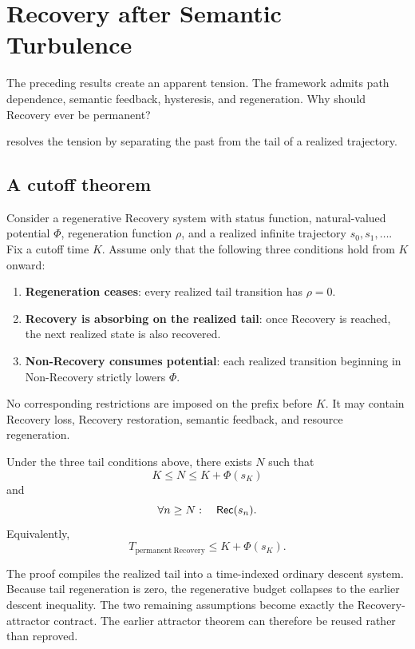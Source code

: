 \section{Recovery after Semantic Turbulence}

The preceding results create an apparent tension. The framework admits path dependence, semantic feedback, hysteresis, and regeneration. Why should Recovery ever be permanent?

 resolves the tension by separating the past from the tail of a realized trajectory.

\subsection{A cutoff theorem}

Consider a regenerative Recovery system with status function, natural-valued potential $\Phi$, regeneration function $\rho$, and a realized infinite trajectory $s_0,s_1,\ldots$. Fix a cutoff time $K$. Assume only that the following three conditions hold from $K$ onward:

\begin{enumerate}
  \item \textbf{Regeneration ceases}: every realized tail transition has $\rho=0$.
  \item \textbf{Recovery is absorbing on the realized tail}: once Recovery is reached, the next realized state is also recovered.
  \item \textbf{Non-Recovery consumes potential}: each realized transition beginning in Non-Recovery strictly lowers $\Phi$.
\end{enumerate}

No corresponding restrictions are imposed on the prefix before $K$. It may contain Recovery loss, Recovery restoration, semantic feedback, and resource regeneration.

\begin{theorem}
Under the three tail conditions above, there exists $N$ such that
\[
K\leq N\leq K+\Phi(s_K)
\]
and
\[
\forall n\geq N:\quad \mathsf{Rec}(s_n).
\]
Equivalently,
\[
\boxed{
T_{\mathrm{permanent\ Recovery}}
\leq K+\Phi(s_K).
}
\]
\end{theorem}

The proof compiles the realized tail into a time-indexed ordinary descent system. Because tail regeneration is zero, the regenerative budget collapses to the earlier descent inequality. The two remaining assumptions become exactly the Recovery-attractor contract. The earlier attractor theorem can therefore be reused rather than reproved.

